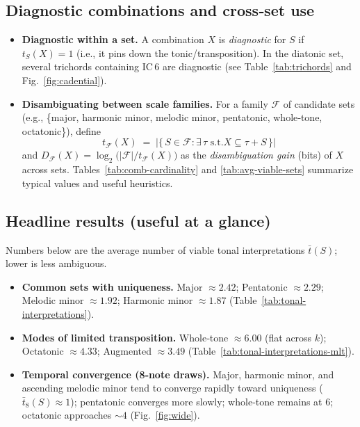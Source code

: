 \documentclass[10pt,twocolumn]{article}
\numberwithin{equation}{section} %
\begin{document}
    \subsection*{Diagnostic combinations and cross‑set use}
    \begin{itemize}
        \item \textbf{Diagnostic within a set.} A combination $X$ is \emph{diagnostic} for $S$ if $t_S(X)=1$ (i.e., it pins down the tonic/transposition).
In the diatonic set, several trichords containing IC\,6 are diagnostic (see Table~\ref{tab:trichords} and Fig.~\ref{fig:cadential}).
        \item \textbf{Disambiguating between scale families.} For a family $\mathcal{F}$ of candidate sets (e.g., \{major, harmonic minor, melodic minor, pentatonic, whole‑tone, octatonic\}), define
        \[
            t_{\mathcal{F}}(X) \;=\; \bigl|\{\,S\in\mathcal{F}:\exists\,\tau \text{ s.t.
} X\subseteq \tau{+}S\,\}\bigr|
        \]
        and $D_{\mathcal{F}}(X)=\log_2\!\bigl(|\mathcal{F}|/t_{\mathcal{F}}(X)\bigr)$ as the \emph{disambiguation gain} (bits) of $X$ across sets.
Tables~\ref{tab:comb-cardinality} and \ref{tab:avg-viable-sets} summarize typical values and useful heuristics.
    \end{itemize}

    \subsection*{Headline results (useful at a glance)}
    Numbers below are the average number of viable tonal interpretations $\bar{t}(S)$; lower is less ambiguous.
    \begin{itemize}
        \item \textbf{Common sets with uniqueness.} Major $\approx 2.42$; Pentatonic $\approx 2.29$; Melodic minor $\approx 1.92$; Harmonic minor $\approx 1.87$ (Table~\ref{tab:tonal-interpretations}).
        \item \textbf{Modes of limited transposition.} Whole‑tone $\approx 6.00$ (flat across $k$); Octatonic $\approx 4.33$; Augmented $\approx 3.49$ (Table~\ref{tab:tonal-interpretations-mlt}).
        \item \textbf{Temporal convergence (8‑note draws).} Major, harmonic minor, and ascending melodic minor tend to converge rapidly toward uniqueness ($\bar{t}_8(S)\approx 1$); pentatonic converges more slowly; whole‑tone remains at $6$; octatonic approaches ${\sim}4$ (Fig.~\ref{fig:wide}).
    \end{itemize}
\end{document}
